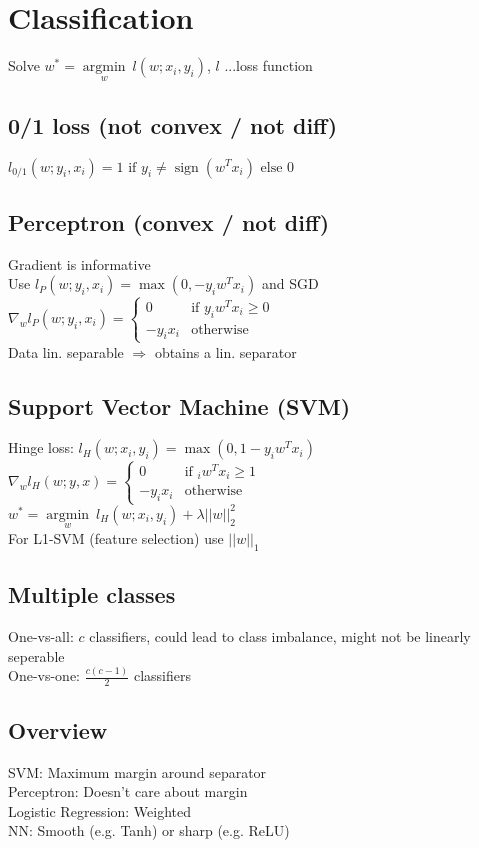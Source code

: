 \section*{Classification}

Solve $w^* = \underset{w}{\operatorname{argmin}} ~ l(w;x_i,y_i)$, $l$ ...loss function

\subsection*{0/1 loss (not convex / not diff)}
$l_{0/1} (w;y_i,x_i) = 1 \text{ if } y_i \neq \operatorname{sign}(w^Tx_i) \text{ else } 0$

\subsection*{Perceptron (convex / not diff)}
Gradient is informative\\
Use $l_P (w;y_i,x_i) = \operatorname{max}(0, -y_i w^T x_i)$ and SGD\\
$\nabla_w l_P(w;y_i,x_i) = 
\begin{cases}
    0 &\text{if } y_i w^T x_i \geq 0\\
    -y_i x_i &\text{otherwise}
\end{cases}$ \\
Data lin. separable $\Rightarrow$ obtains a lin. separator

\subsection*{Support Vector Machine (SVM)}
Hinge loss: $l_H(w;x_i,y_i) = \operatorname{max}(0,1-y_i w^T x_i)$ \\
$\nabla_w l_H(w;y,x) = 
\begin{cases}
    0 &\text{if } _i w^T x_i \geq 1\\
    -y_i x_i &\text{otherwise}
\end{cases}$\\
$w^* = \underset{w}{\operatorname{argmin}} ~ l_H(w;x_i,y_i) + \lambda||w||_2^2$\\ For L1-SVM (feature selection) use $||w||_1$ 

\subsection*{Multiple classes}
One-vs-all: $c$ classifiers, could lead to class imbalance, might not be linearly seperable\\
One-vs-one: $\frac{c(c-1)}{2}$ classifiers

\subsection*{Overview}
SVM: Maximum margin around separator\\
Perceptron: Doesn't care about margin\\
Logistic Regression: Weighted\\
NN: Smooth (e.g. Tanh) or sharp (e.g. ReLU)